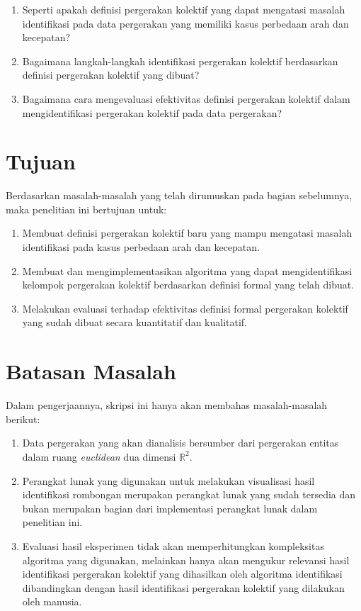 \fi
\begin{enumerate}
    \item Seperti apakah definisi pergerakan kolektif yang dapat mengatasi masalah identifikasi pada data pergerakan yang memiliki kasus perbedaan arah dan kecepatan? 
    \item Bagaimana langkah-langkah identifikasi pergerakan kolektif berdasarkan definisi pergerakan kolektif yang dibuat?  
    \item Bagaimana cara mengevaluasi efektivitas definisi pergerakan kolektif dalam mengidentifikasi pergerakan kolektif pada data pergerakan?
\end{enumerate}

\section{Tujuan}
\label{sec:tujuan}  

Berdasarkan masalah-masalah yang telah dirumuskan pada bagian sebelumnya, maka penelitian ini bertujuan untuk:

\begin{enumerate}
    \item Membuat definisi pergerakan kolektif baru yang mampu mengatasi masalah identifikasi pada kasus perbedaan arah dan kecepatan.
    \item Membuat dan mengimplementasikan algoritma yang dapat mengidentifikasi kelompok pergerakan kolektif berdasarkan definisi formal yang telah dibuat.
    \item Melakukan evaluasi terhadap efektivitas definisi formal pergerakan kolektif yang sudah dibuat secara kuantitatif dan kualitatif.
\end{enumerate}

\section{Batasan Masalah}
\label{sec:batasan}

Dalam pengerjaannya, skripsi ini hanya akan membahas masalah-masalah berikut:

\begin{enumerate}
    \item Data pergerakan yang akan dianalisis bersumber dari pergerakan entitas dalam ruang \textit{euclidean} dua dimensi $\mathbb{R}^2$.
    \item Perangkat lunak yang digunakan untuk melakukan visualisasi hasil identifikasi rombongan merupakan perangkat lunak yang sudah tersedia dan bukan merupakan bagian dari implementasi perangkat lunak dalam penelitian ini.
    \item Evaluasi hasil eksperimen tidak akan memperhitungkan kompleksitas algoritma yang digunakan, melainkan hanya akan mengukur relevansi hasil identifikasi pergerakan kolektif yang dihasilkan oleh algoritma identifikasi dibandingkan dengan hasil identifikasi pergerakan kolektif yang dilakukan oleh manusia.
\end{enumerate}

